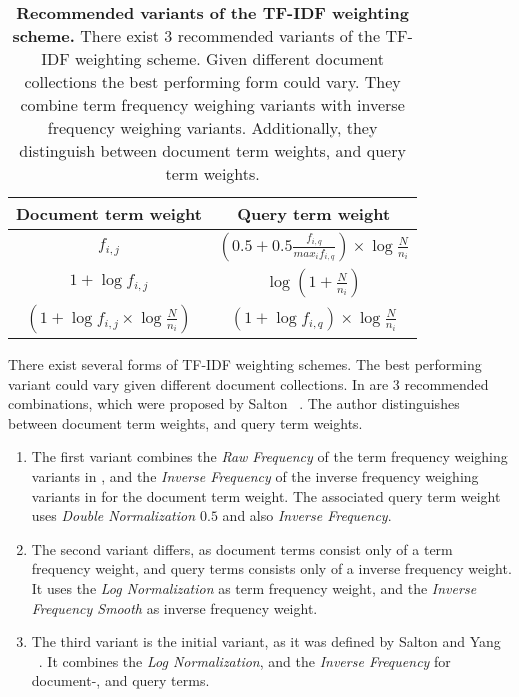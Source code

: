 \begin{table}[b]
    \centering
    \begin{tabular}{ c c }
      \toprule
      \textbf{Document term weight} & \textbf{Query term weight} \\ \midrule
      $f_{i, j}$  & $(0.5 + 0.5 \frac{f_{i, q}}{max_i f_{i, q}}) \times \log \frac{N}{n_i}$  \\
      $1 + \log f_{i, j}$ & $\log (1 + \frac{N}{n_i})$  \\
      $(1 + \log f_{i, j} \times \log \frac{N}{n_i})$ & $(1 + \log f_{i, q}) \times \log \frac{N}{n_i}$  \\
      \bottomrule
    \end{tabular}
  \caption[Recommended variants of the TF-IDF weighting scheme]{\textbf{Recommended variants of the TF-IDF weighting scheme.} There exist $3$ recommended variants of the TF-IDF weighting scheme. Given different document collections the best performing form could vary. They combine term frequency weighing variants with inverse frequency weighing variants. Additionally, they distinguish between document term weights, and query term weights.}
  \label{tbl:recommended_tfidf_weights}
\end{table}
There exist several forms of TF-IDF weighting schemes. The best performing variant could vary given different document collections. In  are $3$ recommended combinations, which were proposed by Salton ~\cite{salton1971}. The author distinguishes between document term weights, and query term weights. 
\begin{enumerate} 
	\item The first variant combines the \textit{Raw Frequency} of the term frequency weighing variants in , and the \textit{Inverse Frequency} of the inverse frequency weighing variants in  for the document term weight. The associated query term weight uses \textit{Double Normalization $0.5$} and also \textit{Inverse Frequency}.
	\item The second variant differs, as document terms consist only of a term frequency weight, and query terms consists only of a inverse frequency weight. It uses the \textit{Log Normalization} as term frequency weight, and the \textit{Inverse Frequency Smooth} as inverse frequency weight.
  \item The third variant is the initial variant, as it was defined by Salton and Yang ~\cite{FT023}. It combines the \textit{Log Normalization}, and the \textit{Inverse Frequency} for document-, and query terms.
\end{enumerate}

